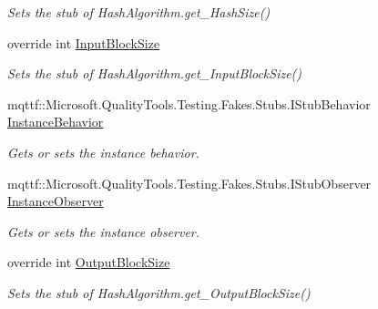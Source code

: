 \begin{DoxyCompactItemize}
\begin{DoxyCompactList}\small\item\em Sets the stub of Hash\-Algorithm.\-get\-\_\-\-Hash\-Size()\end{DoxyCompactList}\item 
override int \hyperlink{class_system_1_1_security_1_1_cryptography_1_1_fakes_1_1_stub_r_i_p_e_m_d160_managed_a7e071033b477b35cb80929d14581d657}{Input\-Block\-Size}
\begin{DoxyCompactList}\small\item\em Sets the stub of Hash\-Algorithm.\-get\-\_\-\-Input\-Block\-Size()\end{DoxyCompactList}\item 
mqttf\-::\-Microsoft.\-Quality\-Tools.\-Testing.\-Fakes.\-Stubs.\-I\-Stub\-Behavior \hyperlink{class_system_1_1_security_1_1_cryptography_1_1_fakes_1_1_stub_r_i_p_e_m_d160_managed_a9a2c7c614cb3acd52e089f7b82f3c972}{Instance\-Behavior}
\begin{DoxyCompactList}\small\item\em Gets or sets the instance behavior.\end{DoxyCompactList}\item 
mqttf\-::\-Microsoft.\-Quality\-Tools.\-Testing.\-Fakes.\-Stubs.\-I\-Stub\-Observer \hyperlink{class_system_1_1_security_1_1_cryptography_1_1_fakes_1_1_stub_r_i_p_e_m_d160_managed_ad1da94433e13575d4a693189a8f8b25f}{Instance\-Observer}
\begin{DoxyCompactList}\small\item\em Gets or sets the instance observer.\end{DoxyCompactList}\item 
override int \hyperlink{class_system_1_1_security_1_1_cryptography_1_1_fakes_1_1_stub_r_i_p_e_m_d160_managed_aacc205d10071e2e9e39074b0640a8983}{Output\-Block\-Size}
\begin{DoxyCompactList}\small\item\em Sets the stub of Hash\-Algorithm.\-get\-\_\-\-Output\-Block\-Size()\end{DoxyCompactList}\end{DoxyCompactItemize}


